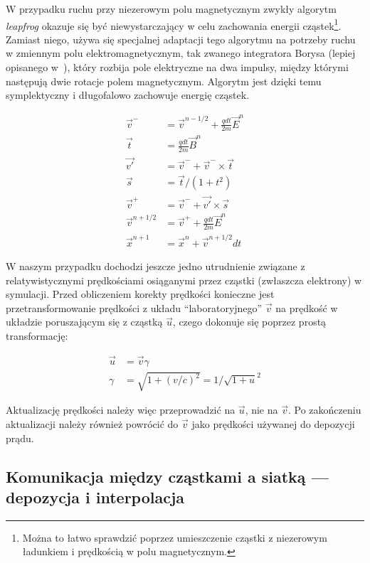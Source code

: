 W przypadku ruchu przy niezerowym polu magnetycznym zwykły algorytm
\emph{leapfrog} okazuje się być niewystarczający w celu zachowania energii
cząstek\footnote{Można to łatwo sprawdzić poprzez umieszczenie cząstki z
niezerowym ładunkiem i prędkością w polu magnetycznym.}.  Zamiast niego, używa
się specjalnej adaptacji tego algorytmu na potrzeby ruchu w zmiennym polu
elektromagnetycznym, tak zwanego integratora Borysa (lepiej opisanego
w~\cite{birdsall}), który rozbija pole elektryczne na dwa impulsy, między
którymi następują dwie rotacje polem magnetycznym. Algorytm jest dzięki temu
symplektyczny i długofalowo zachowuje energię cząstek.

\begin{align}
    \vec{v}^- &= \vec{v}^{n-1/2} + \frac{q dt}{2m} \vec{E}^n 
    \label{eqn:boris-pusher-start}\\
    \vec{t} &= \frac{q dt} {2 m} \vec{B}^n \\
    \vec{v'} &= \vec{v}^- + \vec{v}^- \times \vec{t} \\
    \vec{s} &= \vec{t} / {(1 + t^2)} \\
    \vec{v}^+ &= \vec{v}^- + \vec{v'} \times \vec{s} \\
    \vec{v}^{n+1/2} &= \vec{v}^+ + \frac{q dt}{2m} \vec{E}^n \\
    \vec{x}^{n+1} &= \vec{x}^{n} + \vec{v}^{n+1/2} dt
    \label{eqn:boris-pusher-end}
\end{align}

W naszym przypadku dochodzi jeszcze jedno utrudnienie związane z
relatywistycznymi prędkościami osiąganymi przez cząstki (zwłaszcza
elektrony) w symulacji. Przed obliczeniem korekty prędkości konieczne jest
przetransformowanie prędkości z układu ``laboratoryjnego'' $\vec{v}$ na
prędkość w układzie poruszającym się z cząstką $\vec{u}$, czego dokonuje
się poprzez prostą transformację:

\begin{align}
    \vec{u} &= \vec{v} \gamma \\
    \gamma &= \sqrt{1+{(v/c)}^2} = 1/\sqrt{1+u}^2
    \label{eqn:gamma-transformation}
\end{align}


Aktualizację prędkości należy więc przeprowadzić na $\vec{u}$, nie na
$\vec{v}$. Po zakończeniu
aktualizacji należy również powrócić do $\vec{v}$ jako prędkości używanej
do depozycji prądu.

\subsection{Komunikacja między cząstkami a siatką --- depozycja i interpolacja}

